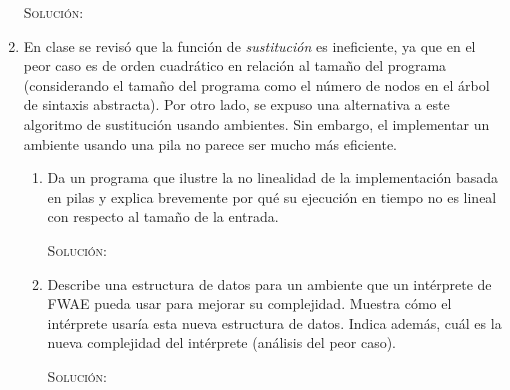 \documentclass[letterpaper,11pt]{article}
\begin{document}
\begin{enumerate}
    \textsc{Solución:}

    \item En clase se revisó que la función de \textit{sustitución} es 
    ineficiente, ya que en el peor caso es de orden cuadrático en relación 
    al tamaño del programa (considerando el tamaño del programa como el 
    número de nodos en el árbol de sintaxis abstracta). Por otro lado, se 
    expuso una alternativa a este algoritmo de sustitución usando 
    ambientes. Sin embargo, el implementar un ambiente usando una pila no 
    parece ser mucho más eficiente.
    \begin{enumerate}
        \item Da un programa que ilustre la no linealidad de la implementación
        basada en pilas y explica brevemente por qué su ejecución en tiempo no
        es lineal con respecto al tamaño de la entrada.

        \textsc{Solución:}

        \item Describe una estructura de datos para un ambiente que un 
        intérprete de FWAE pueda usar para mejorar su complejidad. Muestra 
        cómo el intérprete usaría esta nueva estructura de datos. Indica 
        además, cuál es la nueva complejidad del intérprete (análisis del 
        peor caso).

        \textsc{Solución:}
    \end{enumerate}
\end{enumerate}
\end{document}
